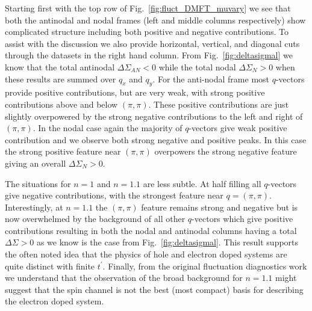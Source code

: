 \documentclass[twocolumn,notitlepage,prb,superscriptaddress,showpacs]{revtex4-1}
\begin{document}
Starting first with the top row of Fig.~\ref{fig:fluct_DMFT_muvary} we see that both the antinodal and nodal frames (left and middle columns respectively) show complicated structure including both positive and negative contributions.
To assist with the discussion we also provide horizontal, vertical, and diagonal cuts through the datasets in the right hand column.
From Fig.~\ref{fig:deltasigmal} we know that the total antinodal $\Delta \Sigma_{AN}<0$ while the total nodal $\Delta \Sigma_{N} >0$ when these results are summed over $q_x$ and $q_y$. 
For the anti-nodal frame most $q$-vectors provide positive contributions, but are very weak, with strong positive contributions above and below $(\pi,\pi)$.  These positive contributions are just slightly overpowered by the strong negative contributions to the left and right of $(\pi,\pi)$.
In the nodal case again the majority of $q$-vectors give weak positive contribution and we observe both strong negative and positive peaks.  In this case the strong positive feature near $(\pi,\pi)$ overpowers the strong negative feature giving an overall $\Delta \Sigma_N >0$.

The situations for $n=1$ and $n=1.1$ are less subtle.  At half filling all $q$-vectors give negative contributions, with the strongest feature near $q=(\pi,\pi)$. 
Interestingly, at $n=1.1$  the $(\pi,\pi)$ feature remains strong and negative but is now overwhelmed by the background of all other $q$-vectors which give positive contributions resulting in both the nodal and antinodal columns having a total $\Delta\Sigma>0$ as we know is the case from Fig.~\ref{fig:deltasigmal}.
This result supports the often noted idea that the physics of hole and electron doped systems are quite distinct with finite $t^\prime$. 
Finally, from the original fluctuation diagnostics work\cite{gunnarsson:2015} we understand that the observation of the broad background for $n=1.1$ might suggest that the spin channel is not the best (most compact) basis for describing the electron doped system.
\end{document}
